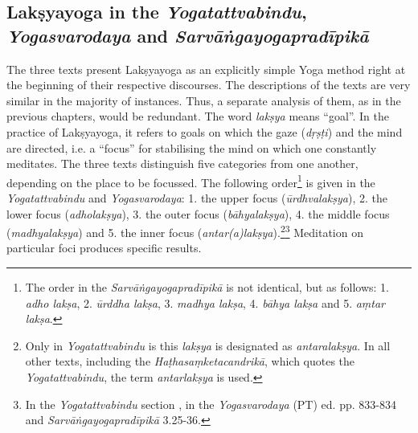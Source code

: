 \subsection{Lakṣyayoga in the \textit{Yogatattvabindu}, \textit{Yogasvarodaya} and \textit{Sarvāṅgayogapradīpikā}}

The three texts present Lakṣyayoga as an explicitly simple Yoga method right at the beginning of their respective discourses. The descriptions of the texts are very similar in the majority of instances. Thus, a separate analysis of them, as in the previous chapters, would be redundant. The word \textit{lakṣya} means ``goal''. In the practice of Lakṣyayoga, it refers to goals on which the gaze (\textit{dṛṣṭi}) and the mind are directed, i.e. a ``focus'' for stabilising the mind on which one constantly meditates. The three texts distinguish five categories from one another, depending on the place to be focussed. The following order\footnote{The order in the \textit{Sarvāṅgayogapradīpikā} is not identical, but as follows: 1. \textit{adho lakṣa}, 2. \textit{ūrddha lakṣa}, 3. \textit{madhya lakṣa}, 4. \textit{bāhya lakṣa} and 5. \textit{aṃtar lakṣa}.} is given in the \textit{Yogatattvabindu} and \textit{Yogasvarodaya}: 1. the upper focus (\textit{ūrdhvalakṣya}), 2. the lower focus (\textit{adholakṣya}), 3. the outer focus (\textit{bāhyalakṣya}), 4. the middle focus (\textit{madhyalakṣya}) and 5. the inner focus (\textit{antar(a)lakṣya}).\footnote{Only in \textit{Yogatattvabindu} is this \textit{lakṣya} is designated as \textit{antaralakṣya}. In all other texts, including the \textit{Haṭhasaṃketacandrikā}, which quotes the \textit{Yogatattvabindu}, the term \textit{antarlakṣya} is used.}\footnote{In the \textit{Yogatattvabindu} section , in the \textit{Yogasvarodaya} (PT) ed. pp. 833-834 and \textit{Sarvāṅgayogapradīpikā} 3.25-36.} Meditation on particular foci produces specific results.

